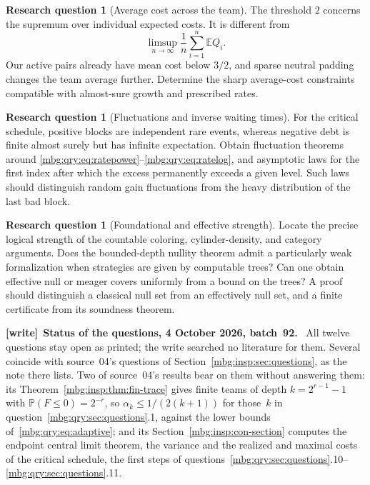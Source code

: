 \documentclass[11pt,letterpaper]{article}
\theoremstyle{definition}
\newcommand{\E}{\mathbb E}
\newcommand{\Prb}{\mathbb P}
\newtheorem{question}[theorem]{Research question}
\newenvironment{writenote}[1][]{\par\smallskip\begingroup\small
 \noindent\textbf{[write]}\if\relax\detokenize{#1}\relax\else~\textbf{#1.}\fi\ }%
 {\par\endgroup\smallskip}
\begin{document}
\begin{question}[Average cost across the team]
The threshold \(2\) concerns the supremum over individual expected
costs. It is different from
\[
 \limsup_{n\to\infty}\frac1n\sum_{i=1}^n\E Q_i.
\]
Our active pairs already have mean cost below \(3/2\), and sparse
neutral padding changes the team average further. Determine the
sharp average-cost constraints compatible with almost-sure growth
and prescribed rates.
\end{question}

\begin{question}[Fluctuations and inverse waiting times]
For the critical schedule, positive blocks are independent rare
events, whereas negative debt is finite almost surely but has
infinite expectation. Obtain fluctuation theorems around
\eqref{mbg:qry:eq:ratepower}--\eqref{mbg:qry:eq:ratelog}, and asymptotic laws for the
first index after which the excess permanently exceeds a given
level. Such laws should distinguish random gain fluctuations from
the heavy distribution of the last bad block.
\end{question}

\begin{question}[Foundational and effective strength]
Locate the precise logical strength of the countable coloring,
cylinder-density, and category arguments. Does the bounded-depth
nullity theorem admit a particularly weak formalization when
strategies are given by computable trees? Can one obtain effective
null or meager covers uniformly from a bound on the trees?
A proof should distinguish a classical null set from an effectively
null set, and a finite certificate from its soundness theorem.
\end{question}

\begin{writenote}[Status of the questions, 4 October 2026, batch~92]
All twelve questions stay open as printed; the write searched no literature for them. Several coincide with source~04's questions of Section~\ref{mbg:insp:sec:questions}, as the note there lists. Two of source~04's results bear on them without answering them: its Theorem~\ref{mbg:insp:thm:fin-trace} gives finite teams of depth $k=2^{r-1}-1$ with $\Prb(F\le0)=2^{-r}$, so $\alpha_k\le1/(2(k+1))$ for those~$k$ in question~\ref{mbg:qry:sec:questions}.1, against the lower bounds of~\eqref{mbg:qry:eq:adaptive}; and its Section~\ref{mbg:insp:con-section} computes the endpoint central limit theorem, the variance and the realized and maximal costs of the critical schedule, the first steps of questions~\ref{mbg:qry:sec:questions}.10--\ref{mbg:qry:sec:questions}.11.
\end{writenote}
\end{document}
